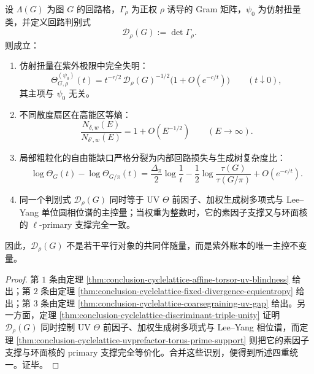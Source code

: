 \begin{theorem}[回路判别式的四重统一与紫外扭量失明]\label{thm:conclusion-loop-discriminant-uv-ledger-fourfold-unity}
设 \(\Lambda(G)\) 为图 \(G\) 的回路格，\(\Gamma_\rho\) 为正权 \(\rho\) 诱导的 Gram 矩阵，\(\psi_0\) 为仿射扭量类，并定义回路判别式
\[
\mathscr D_\rho(G):=\det\Gamma_\rho.
\]
则成立：
\begin{enumerate}
  \item 仿射扭量在紫外极限中完全失明：
  \[
  \Theta_{G,\rho}^{(\psi_0)}(t)
  =
  t^{-r/2}\,\mathscr D_\rho(G)^{-1/2}
  \bigl(1+O(e^{-c/t})\bigr)
  \qquad (t\downarrow 0),
  \]
  其主项与 \(\psi_0\) 无关。

  \item 不同散度扇区在高能区等熵：
  \[
  \frac{N_{\delta,w}(E)}{N_{\delta',w}(E)}
  =
  1+O(E^{-1/2})
  \qquad(E\to\infty).
  \]

  \item 局部粗粒化的自由能缺口严格分裂为内部回路损失与生成树复杂度比：
  \[
  \log \Theta_G(t)-\log \Theta_{G/\pi}(t)
  =
  \frac{\Delta_\pi}{2}\log\frac1t
  -\frac12\log\frac{\tau(G)}{\tau(G/\pi)}
  +O(e^{-c/t}).
  \]

  \item 同一个判别式 \(\mathscr D_\rho(G)\) 同时等于 UV \(\Theta\) 前因子、加权生成树多项式与 Lee--Yang 单位圆相位谱的主控量；当权重为整数时，它的素因子支撑又与环面核的 \(\ell\)-primary 支撑完全一致。
\end{enumerate}
因此，\(\mathscr D_\rho(G)\) 不是若干平行对象的共同伴随量，而是紫外账本的唯一主控不变量。
\end{theorem}
\begin{proof}
第 \(1\) 条由定理 \ref{thm:conclusion-cyclelattice-affine-torsor-uv-blindness} 给出；第 \(2\) 条由定理 \ref{thm:conclusion-cyclelattice-fixed-divergence-equientropy} 给出；第 \(3\) 条由定理 \ref{thm:conclusion-cyclelattice-coarsegraining-uv-gap} 给出。另一方面，定理 \ref{thm:conclusion-cyclelattice-discriminant-triple-unity} 证明 \(\mathscr D_\rho(G)\) 同时控制 UV \(\Theta\) 前因子、加权生成树多项式与 Lee--Yang 相位谱，而定理 \ref{thm:conclusion-cyclelattice-uvprefactor-torus-prime-support} 则把它的素因子支撑与环面核的 primary 支撑完全等价化。合并这些识别，便得到所述四重统一。证毕。
\end{proof}

